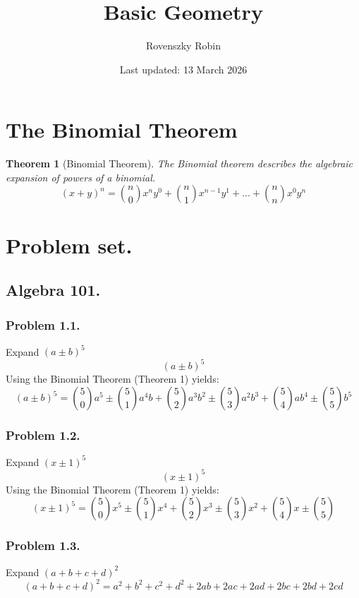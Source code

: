 \documentclass{article}
\title{Basic Geometry}
\author{Rovenszky Robin}
\date{Last updated: 13 March 2026}
\newtheorem{theorem}{Theorem}
\begin{document}
\maketitle

\section{The Binomial Theorem}
\begin{theorem}[Binomial Theorem]
The Binomial theorem describes the algebraic expansion of powers of a binomial.
\begin{equation}
    (x+y)^n = \binom{n}{0}x^ny^0 + \binom{n}{1}x^{n-1}y^1 + ... + \binom{n}{n}x^0y^n
\end{equation}
\end{theorem}

\section{Problem set.}
\subsection{Algebra 101.}
\subsubsection{Problem 1.1.}
Expand $(a\pm b)^5$
\begin{equation}
    (a \pm b)^5
\end{equation}
Using the Binomial Theorem (Theorem 1) yields:
\begin{equation}
    (a \pm b)^5 = \binom{5}{0}a^5 \pm \binom{5}{1}a^4b + \binom{5}{2}a^3b^2 \pm \binom{5}{3}a^2b^3 + \binom{5}{4}ab^4 \pm \binom{5}{5}b^5
\end{equation}

\subsubsection{Problem 1.2.}
Expand $(x\pm 1)^5$
\begin{equation}
    (x \pm 1)^5
\end{equation}
Using the Binomial Theorem (Theorem 1) yields:
\begin{equation}
    (x \pm 1)^5 = \binom{5}{0}x^5\pm \binom{5}{1}x^4 + \binom{5}{2}x^3 \pm \binom{5}{3}x^2 + \binom{5}{4}x \pm \binom{5}{5}
\end{equation}

\subsubsection{Problem 1.3.}
Expand $(a+b+c+d)^2$
\begin{equation}
    (a+b+c+d)^2 = a^2 + b^2 + c^2 + d^2 + 2ab + 2ac + 2ad + 2bc + 2bd + 2cd
\end{equation}
\end{document}
